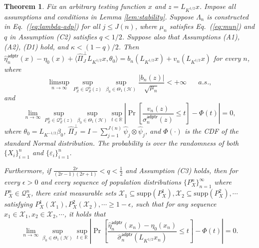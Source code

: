 \documentclass[11pt,a4paper]{article}
\renewcommand{\hat}{\widehat}
\theoremstyle{definition}
\theoremstyle{plain}
\newtheorem{theorem}{Theorem}[section]
\theoremstyle{remark}
\newcommand{\supp}{\mathrm{supp}}
\newcommand{\mX}{\mathcal X}
\newcommand{\mH}{\mathcal H}
\newcommand{\adptr}{\mathsf{adptr}}
\begin{document}
\begin{theorem}
Fix an arbitrary testing function $x$ and $z=L_{K^{1/2}}x$.
Impose all assumptions and conditions in Lemma \ref{lem:stability}. Suppose $\Lambda_n$ is constructed in Eq.~(\ref{eq:lambda-adp}) for all $j\leq J(n)$,
where $\mu_n$ satisfies Eq.~(\ref{eq:mun}) and $q$ in Assumption (C2) satisfies $q<1/2$. Suppose also that Assumptions (A1), (A2), (D1) hold, and $\kappa<(1-q)/2$. Then 
$\hat\eta_n^\adptr(x)-\eta_0(x)+\langle\hat\Pi_J^\perp L_{K^{1/2}}x,\theta_0\rangle = b_n(L_{K^{1/2}}x)+v_n(L_{K^{1/2}}x)$ for every $n$, where
$$
\limsup_{n\to\infty}\sup_{P_Z^n\in\mathcal Q_Z^n(z)}\sup_{\beta_0\in\Theta_1(\mH)} \frac{|b_n(z)|}{\sqrt{\mu_n}} < +\infty\;\;\;\;\;\;a.s.,
$$
and
$$
\lim_{n\to\infty} \sup_{P_Z^n\in\mathcal Q_Z^n(z)}\sup_{\beta_0\in\Theta_1(\mH)}\sup_{t\in\mathbb R}\left|\Pr\left[\frac{v_n(z)}{\hat\sigma_n^\adptr(z)}\leq t\right] - \Phi(t)\right| = 0,
$$
where $\theta_0=L_{K^{-1/2}}\beta_0$, $\hat\Pi_J^\perp = I - \sum_{j=1}^{J(n)}\hat\psi_j\otimes\hat\psi_j$, and $\Phi(\cdot)$ is the CDF of the standard Normal distribution.
The probability is over the randomness of both $\{X_i\}_{i=1}^n$ and $\{\varepsilon_i\}_{i=1}^n$. 

Furthermore, if $\frac{2r}{(2r-1)(2r+1)}<q<\frac{1}{2}$ and Assumption (C3) holds, then for every $\epsilon>0$ and every sequence of population distributions $\{P_X^n\}_{n=1}^{\infty}$ where $P_X^n\in\mathcal Q_X^n$, there exist measurable sets $\mX_1\subseteq\supp(P_X^1),\mX_2\subseteq\supp(P_X^2),\cdots$ satisfying $P_X^1(\mX_1),P_X^2(\mX_2),\cdots\geq 1-\epsilon$,
such that for any sequence $x_1\in\mX_1,x_2\in\mX_2,\cdots$, it holds that
$$
\lim_{n\to\infty} \sup_{\beta_0\in\Theta_1(\mH)}\sup_{t\in\mathbb R}\left|\Pr\left[\frac{\hat\eta_n^\adptr(x_n)-\eta_0(x_n)}{\hat\sigma_n^\adptr(L_{K^{1/2}}x_n)}\leq t\right] - \Phi(t)\right| = 0.
$$
%
\label{thm:adptr-limiting}
\end{theorem}
\end{document}
